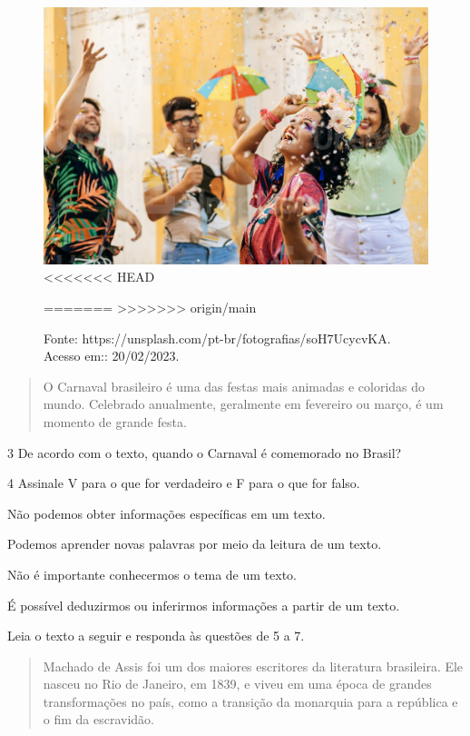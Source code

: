\begin{figure}[htpb!]
\includegraphics[width=.5\textwidth]{./imgs/img2.jpg}
<<<<<<< HEAD
\caption{Fonte: https://unsplash.com/pt-br/fotografias/soH7UcycvKA. Acesso em:: 20/02/2023.}
=======
>>>>>>> origin/main
\end{figure}

\begin{quote}
O Carnaval brasileiro é uma das festas mais animadas e coloridas do
mundo. Celebrado anualmente, geralmente em fevereiro ou março, é um
momento de grande festa.
\end{quote}



\num{3} De acordo com o texto, quando o Carnaval é comemorado no Brasil?


\num{4} Assinale V para o que for verdadeiro e F para o que for falso.

\begin{boxlist}
 Não podemos obter informações específicas em um texto.

 Podemos aprender novas palavras por meio da leitura de um texto.

 Não é importante conhecermos o tema de um texto.

 É possível deduzirmos ou inferirmos informações a partir de um texto.
\end{boxlist}

Leia o texto a seguir e responda às questões de 5 a 7.

\begin{quote}
Machado de Assis foi um dos maiores escritores da literatura
brasileira. Ele nasceu no Rio de Janeiro, em 1839, e viveu em uma época
de grandes transformações no país, como a transição da monarquia para a
república e o fim da escravidão.
\end{quote}

